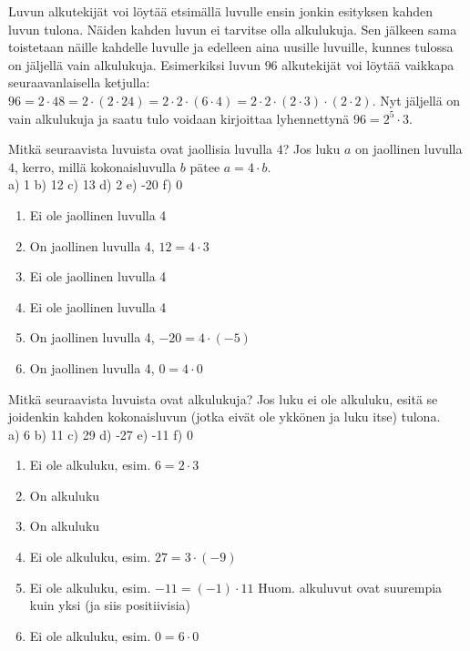 Luvun alkutekijät voi löytää etsimällä luvulle ensin jonkin esityksen kahden luvun tulona. Näiden kahden luvun ei tarvitse olla alkulukuja. Sen jälkeen sama toistetaan näille kahdelle luvulle ja edelleen aina uusille luvuille, kunnes tulossa on jäljellä vain alkulukuja. Esimerkiksi luvun $96$ alkutekijät voi löytää vaikkapa seuraavanlaisella ketjulla: $96 = 2 \cdot 48 = 2 \cdot (2 \cdot 24) = 2 \cdot 2 \cdot (6 \cdot 4) = 2 \cdot 2 \cdot (2 \cdot 3) \cdot (2 \cdot 2)$. Nyt jäljellä on vain alkulukuja ja saatu tulo voidaan kirjoittaa lyhennettynä $96 = 2^5 \cdot 3$.

\begin{tehtava}
Mitkä seuraavista luvuista ovat jaollisia luvulla $4$? Jos luku $a$ on jaollinen luvulla $4$, kerro, millä kokonaisluvulla $b$ pätee $a = 4 \cdot b$.\\
a) 1 \quad b) 12  \quad c) 13 \quad d) 2 \quad e) -20 \quad f) 0

\begin{vastaus}
\begin{enumerate}
	\item Ei ole jaollinen luvulla 4
	\item On jaollinen luvulla 4, $12 = 4 \cdot 3$
	\item Ei ole jaollinen luvulla 4
	\item Ei ole jaollinen luvulla 4
	\item On jaollinen luvulla 4, $-20 = 4 \cdot (-5)$
	\item On jaollinen luvulla 4, $0 = 4 \cdot 0$
\end{enumerate}
\end{vastaus}
\end{tehtava}

\begin{tehtava}
Mitkä seuraavista luvuista ovat alkulukuja? Jos luku ei ole alkuluku, esitä se joidenkin kahden kokonaisluvun (jotka eivät ole ykkönen ja luku itse) tulona.\\
a) 6 \quad b) 11 \quad c) 29 \quad d) -27 \quad e) -11 \quad f) 0

\begin{vastaus}
\begin{enumerate}
	\item Ei ole alkuluku, esim. $6 = 2 \cdot 3$
	\item On alkuluku
	\item On alkuluku
	\item Ei ole alkuluku, esim. $27 = 3 \cdot (-9)$
	\item Ei ole alkuluku, esim. $-11 = (-1) \cdot 11$ Huom. alkuluvut ovat suurempia kuin yksi (ja siis positiivisia)
	\item Ei ole alkuluku, esim. $0 = 6 \cdot 0$
\end{enumerate}
\end{vastaus}
\end{tehtava}


